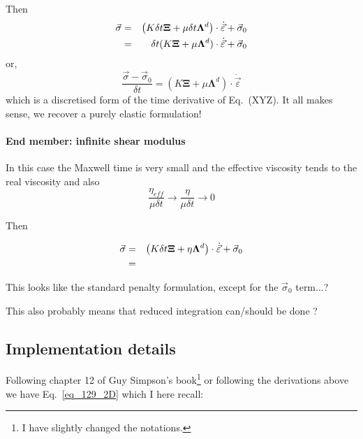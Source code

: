 Then
\begin{eqnarray}
\vec{\sigma}
&=&
\left(
K \delta t {\bm \Xi}
+
\mu \delta t {\bm \Lambda}^d
\right)
\cdot
\dot{\vec{\varepsilon}}
+
\vec{\sigma}_0 \nonumber\\
&=& 
\delta t (K  {\bm \Xi}
+ \mu  {\bm \Lambda}^d) \cdot 
\dot{\vec{\varepsilon}}
+
\vec{\sigma}_0 
\end{eqnarray}
or,
\[
\frac{\vec\sigma - \vec\sigma_0}{\delta t}
=(
K  {\bm \Xi}
+ \mu  {\bm \Lambda}^d)
\cdot \dot{\vec{\varepsilon}}
\]
which is a discretised form of the time derivative of Eq.~(XYZ). It all makes sense, we recover a purely 
elastic formulation!


\paragraph{End member: infinite shear modulus}
In this case the Maxwell time is very small and the effective
viscosity tends to the real viscosity and also  
\[
\frac{\eta_{eff}}{\mu \delta t} 
\rightarrow 
\frac{\eta}{\mu \delta t} 
\rightarrow 0
\]

Then

\begin{eqnarray}
\vec{\sigma}
&=&
\left(
K \delta t {\bm \Xi}
+
\eta {\bm \Lambda}^d
\right)
\cdot
\dot{\vec{\varepsilon}}
+
\vec{\sigma}_0 \nonumber\\
&=& 
\end{eqnarray}

This looks like the standard penalty formulation, except for 
the $\vec{\sigma}_0$ term...?

This also probably means that reduced integration can/should be done ?

\subsection*{Implementation details}

Following chapter 12 of Guy Simpson's book\footnote{I have slightly changed the notations.} \cite{simp17} 
or following the derivations above we have Eq.~\eqref{eq_129_2D}
which I here recall:

